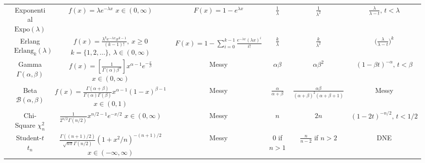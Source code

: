 \documentclass[10pt,landscape]{article}
\newcommand{\Expo}{\textrm{Expo}}
\begin{document}
\begin{minipage}{.80\linewidth}
{\begin{tabular}{ccccccc}
&\shortstack{Exponential \\ $\Expo(\lambda)$} & \shortstack{$f(x) = \lambda e^{-\lambda x}$\\$ x \in (0, \infty)$} & $ F(x) = 1-e^{\lambda x} $ & $\frac{1}{\lambda}$  & $\frac{1}{\lambda^2}$ & $\frac{\lambda}{\lambda - t}, \, t < \lambda$\\
\cmidrule(l{2pt}r{2pt}){2-7}

&\shortstack{Erlang \\ $ \text{Erlang}_k(\lambda) $} & \shortstack{ $ f(x) = \frac{\lambda^k e^{-\lambda x} x^{k-1}}{(k-1)!},\  x\geq 0 $ \\ $ k= \{ 1,2,\hdots \},\ \lambda\in(0,\infty) $ } & $ F(x) = 1- \sum_{i=0}^{k-1} \frac{ e^{-\lambda x} (\lambda x)^i }{i!} $ & $ \frac{k}{\lambda} $ & $ \frac{k}{ \lambda ^2 } $ & $ \Big( \frac{\lambda}{\lambda - t}  \Big)^k   $ \\
\cmidrule(l{2pt}r{2pt}){2-7}

&\shortstack{Gamma \\ $\Gamma(\alpha, \beta)$} & \shortstack{$ f(x)= \left[ \frac{1}{\Gamma(\alpha) \beta^{\alpha} } \right] x^{\alpha-1} e^{-\frac{x}{\beta} }$ \\ $ x \in (0, \infty)$} & Messy& $ \alpha \beta $ & $ \alpha \beta^2 $ & $ (1-\beta t)^{-\alpha}, \, t < \beta$ \\
\cmidrule(l{2pt}r{2pt}){2-7}

&\shortstack{Beta \\  $ \mathcal{B}(\alpha, \beta) $} & \shortstack{$f(x) = \frac{\Gamma(\alpha+\beta)}{\Gamma(\alpha)\Gamma(\beta)}x^{\alpha-1}(1-x)^{\beta-1}$\\$x \in (0, 1) $} & Messy & $ \frac{\alpha}{\alpha + \beta}$  & $\frac{\alpha \beta}{(\alpha + \beta)^2(\alpha +\beta + 1)}$ & Messy \\
\cmidrule(l{2pt}r{2pt}){2-7}

&\shortstack{Chi-Square \\ $\chi_n^2$} & \shortstack{$\frac{1}{2^{n/2}\Gamma(n/2)}x^{n/2 - 1}e^{-x/2}$\\$x \in (0, \infty) $} & Messy & $n$  & $2n$ & $(1 - 2t)^{-n/2}, \, t < 1/2$\\
\cmidrule(l{2pt}r{2pt}){2-7}

&\shortstack{Student-$t$ \\ $t_n$} & \shortstack{$\frac{\Gamma((n+1)/2)}{\sqrt{n\pi} \Gamma(n/2)} (1+x^2/n)^{-(n+1)/2}$\\$x \in (-\infty, \infty)$} & Messy & $0$ if $n>1$ & $\frac{n}{n-2}$ if $n>2$ & DNE\\
\cmidrule(l{2pt}r{2pt}){2-7}


\end{tabular}}
\end{minipage}
\end{document}
